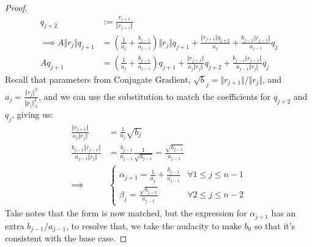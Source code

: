 \documentclass[]{article}
\theoremstyle{definition}
\begin{document}
\begin{appendices}
\begin{proof}
\begin{align}
                    q_{j + 2} &:= \frac{r_{j + 1}}{\Vert r_{j + 1}\Vert}
                    \\
                    \implies 
                    A\Vert r_j\Vert q_{j + 1} 
                    &= 
                    \left(
                        \frac{1}{a_j} + \frac{b_{j - 1}}{a_{j - 1}}
                    \right)\Vert r_j\Vert q_{j + 1}
                    + 
                    \frac{\Vert r_{j + 1}\Vert q_{j + 2}}{a_j}
                    +
                    \frac{b_{j - 1}\Vert r_{j - 1}\Vert}{a_{j - 1}}q_{j}
                    \\
                    Aq_{j + 1} &= 
                    \left(
                        \frac{1}{a_j} + \frac{b_{j - 1}}{a_{j - 1}} 
                    \right)
                    q_{j + 1}
                    + 
                    \frac{\Vert r_{j + 1}\Vert}{a_j \Vert r_j\Vert}q_{j + 2} + 
                    \frac{b_{j - 1}\Vert r_{j - 1}\Vert}{a_{j - 1}\Vert r_j\Vert}q_j
                \end{align}
                Recall that parameters from Conjugate Gradient, $\sqrt b_j = \Vert r_{j + 1}\Vert/\Vert r_j\Vert$, and $a_j = \frac{\Vert r_j\Vert^2}{\Vert p_j\Vert_A^2}$, and we can use the substitution to match the coefficients for $q_{j + 2}$ and $q_j$, giving us: 
                \begin{align}
                    \frac{\Vert r_{j + 1}\Vert}{a_j\Vert r_j\Vert} &= 
                    \frac{1}{a_j}\sqrt{b_j}
                    \\
                    \frac{b_{j - 1}\Vert r_{j - 1}\Vert}{a_{j - 1}\Vert r_j \Vert}
                    &= 
                    \frac{b_{j - 1}}{a_{j - 1}}\frac{1}{\sqrt{b_{j - 1}}}
                    = 
                    \frac{\sqrt{b_{j - 1}}}{a_{j - 1}}
                    \\
                    \implies& 
                    \begin{cases}
                        \alpha_{j + 1} = \frac{1}{a_j} + \frac{b_{j - 1}}{a_{j - 1}}
                        & \forall 1 \le j \le n - 1
                        \\
                        \beta_{j} = \frac{\sqrt{b_{j - 1}}}{a_{j - 1}}
                        & \forall 2 \le j \le n - 2 
                    \end{cases}
                \end{align}
                Take notes that the form is now matched, but the expression for $\alpha_{j + 1}$ has an extra $b_{j - 1}/a_{j - 1}$, to resolve that, we take the audacity to make $b_0$ so that it's consistent with the base case. 
            \end{proof}

\end{appendices}
\end{document}
